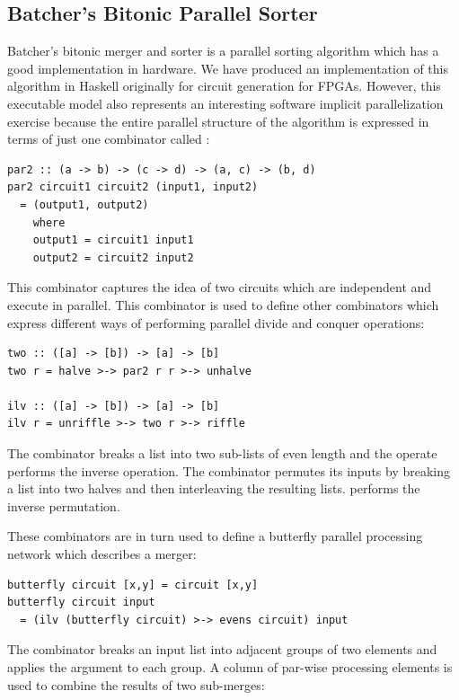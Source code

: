\subsection{Batcher's Bitonic Parallel Sorter}
Batcher's bitonic merger and sorter is a parallel sorting algorithm which has a good implementation in hardware. We have produced an implementation of this algorithm in Haskell originally for circuit generation for FPGAs. However, this executable model also represents an interesting software implicit parallelization exercise because the entire parallel structure of the algorithm is expressed in terms of just one combinator called :

\begin{lstlisting}
par2 :: (a -> b) -> (c -> d) -> (a, c) -> (b, d)
par2 circuit1 circuit2 (input1, input2)
  = (output1, output2)
    where
    output1 = circuit1 input1
    output2 = circuit2 input2
\end{lstlisting}

This combinator captures the idea of two circuits which are independent and execute in parallel. This combinator is used to define other combinators which express different ways of performing parallel divide and conquer operations:

\begin{lstlisting}
two :: ([a] -> [b]) -> [a] -> [b]
two r = halve >-> par2 r r >-> unhalve

ilv :: ([a] -> [b]) -> [a] -> [b]
ilv r = unriffle >-> two r >-> riffle
\end{lstlisting}

The  combinator breaks a list into two sub-lists of even length and the  operate performs the inverse operation. The  combinator permutes its inputs by breaking a list into two halves and then interleaving the resulting lists.  performs the inverse permutation.

These combinators are in turn used to define a butterfly parallel processing network which describes a merger:

\begin{lstlisting}
butterfly circuit [x,y] = circuit [x,y]
butterfly circuit input
  = (ilv (butterfly circuit) >-> evens circuit) input
\end{lstlisting}

The  combinator breaks an input list into adjacent groups of two elements and applies the  argument to each group.  A column of par-wise processing elements is used to combine the results of two sub-merges:

